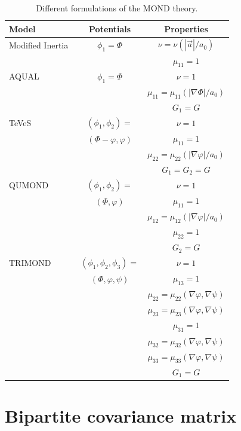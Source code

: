 \documentclass[aps,prd,reprint,superscriptaddress,nofootinbib,floatfix]{revtex4-2}
\begin{document}
\begin{table}[H]
\centering
\caption{Different formulations of the MOND theory.}
\begin{tabular}{ l|c|c }
\toprule
Model & Potentials & Properties \\
\midrule\midrule
Modified Inertia~\cite{MOND-Milgrom1992}	& $\phi_1 = \Phi$ & 
$\nu=\nu(|\vec{a}|/a_{0})$ 	\\
&	&	$\mu_{11}=1$
\\	\midrule
AQUAL~\cite{Lag4MOND-Bekenstein1984} & $\phi_1 = \Phi$	& 
$\nu=1$	\\
&	&	$\mu_{11}=\mu_{11}(|\nabla\Phi|/a_{0})$ \\
& & $G_{1}=G$
\\	\midrule
TeVeS~\cite{TeVeS-Bekenstein2004} & $(\phi_1, \phi_2) = $ &	
$\nu=1$				\\
& $(\Phi - \varphi,\varphi)$	&	$\mu_{11} = 1$	\\
&	&	$\mu_{22} =\mu_{22}(|\nabla\varphi|/a_{0})$
\\	
& & $G_{1}=G_{2}=G$\\
\midrule
QUMOND~\cite{MOND-QLinear-Milgrom2009} & $(\phi_1,\phi_2) = $ &
$\nu=1$				\\
& $(\Phi,\varphi)$	&	$\mu_{11} = 1$	\\
&	&	$\mu_{12} =\mu_{12}(|\nabla\varphi|/a_{0})$	\\
&	&	$\mu_{22} = 1$	\\
&	&	$G_{2}=G$
\\	\midrule
TRIMOND~\cite{Milgrom:2023idw} & $(\phi_1,\phi_2,\phi_3) =$ &
$\nu=1$				\\
& $(\Phi,\varphi,\psi)$	&	$\mu_{13} = 1$	\\
&	&	$\mu_{22} =\mu_{22}(\nabla\varphi,\nabla\psi)$	\\
&	&	$\mu_{23} =\mu_{23}(\nabla\varphi,\nabla\psi)$	\\
&	&	$\mu_{31} = 1$	\\
&	&	$\mu_{32} =\mu_{32}(\nabla\varphi,\nabla\psi)$	\\
&	&	$\mu_{33} =\mu_{33}(\nabla\varphi,\nabla\psi)$	\\
&	&	$G_{1}=G$ 		
\\  \bottomrule
\end{tabular}
\label{tab:ManyMOND}
\end{table}




\section*{Bipartite covariance matrix}
\label{sec:CovMat}
\end{document}
